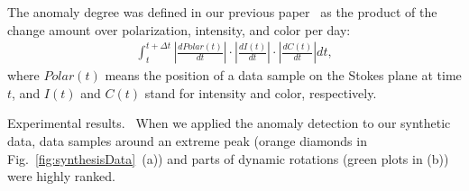 The anomaly degree was defined in our previous paper~\cite{Sawada2018} as the product of the change amount over polarization, intensity, and color per day:
\begin{equation*}
\begin{split}
  \int_t^{t + \Delta t}\left|\frac{dPolar(t)}{dt}\right|\cdot\left|\frac{dI(t)}{dt}\right|\cdot\left|\frac{dC(t)}{dt}\right|dt,
  \label{eq:anomaly}
\end{split}
\end{equation*}
where $Polar(t)$ means the position of a data sample on the Stokes plane at time $t$, and $I(t)$ and $C(t)$ stand for intensity and color, respectively. 

\textsf{Experimental results.\ } When we applied the anomaly detection to our synthetic data, 
data samples around an extreme peak (orange diamonds in Fig.~\ref{fig:synthesisData}~(a)) and parts of dynamic rotations (green plots in (b)) were highly ranked.


%
%
